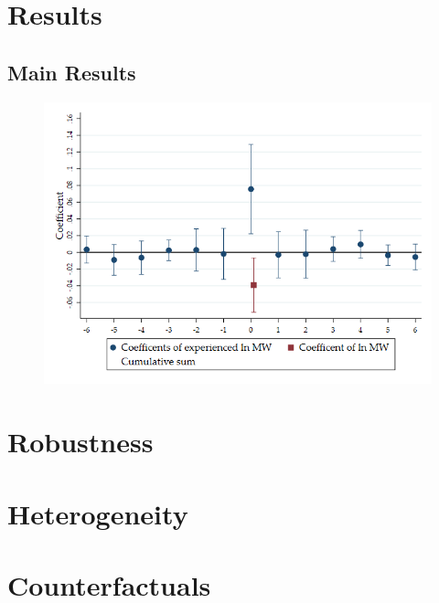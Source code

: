 \documentclass[aspectratio=169]{beamer}
\begin{document}
\section{Results}

\subsection{Main Results}


\begin{frame}
    \begin{figure}
        \centering
        \vspace{-2mm}
        \includegraphics[scale = 0.46]{../../../analysis/fd_baseline/output/fd_baseline_exp_ln_mw_dynamic.png}
    \end{figure}   
\end{frame}

\section{Robustness}

\section{Heterogeneity}

\section{Counterfactuals}
\end{document}
